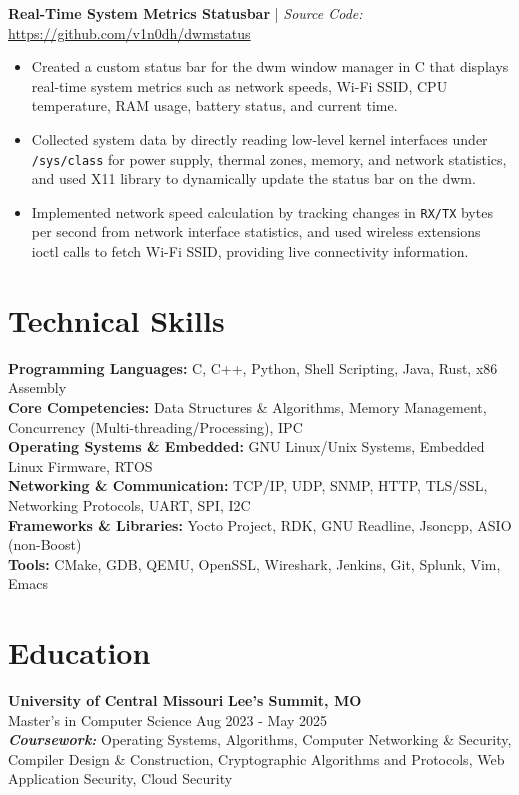 \documentclass[10pt, letterpad, sans]{extarticle}
\newcommand{\projsection}[2] {
	\raggedright{\normalsize\bfseries{#1}} | {\small \textit{Source Code:} \hspace{0.1em} \href{#2}{#2}}
}
\newcommand{\edusection}[5] {
	\raggedright\normalsize{\textbf{#1}
	\hfill {\small \textbf{#2}} } \\
	{#4}
	\hfill {\small {#3}} \\
	{\small #5} }
\begin{document}
\vspace*{0.5em}
\projsection
{Real-Time System Metrics Statusbar}
{https://github.com/v1n0dh/dwmstatus}
\begin{itemize}[leftmargin=6mm]
	\item{Created a custom status bar for the dwm window manager in C that displays real-time system metrics such as network speeds, Wi-Fi SSID, CPU temperature, RAM usage, battery status, and current time.}
	\item{Collected system data by directly reading low-level kernel interfaces under \texttt{/sys/class} for power supply, thermal zones, memory, and network statistics, and used X11 library to dynamically update the status bar on the dwm.}
	\item{Implemented network speed calculation by tracking changes in \texttt{RX/TX} bytes per second from network interface statistics, and used wireless extensions ioctl calls to fetch Wi-Fi SSID, providing live connectivity information.}
\end{itemize}

\section{Technical Skills}
\textbf{Programming Languages:} C, C++, Python, Shell Scripting, Java, Rust, x86 Assembly \\
\textbf{Core Competencies:} Data Structures \& Algorithms, Memory Management, Concurrency (Multi-threading/Processing), IPC \\
\textbf{Operating Systems \& Embedded:} GNU Linux/Unix Systems, Embedded Linux Firmware, RTOS \\
\textbf{Networking \& Communication:} TCP/IP, UDP, SNMP, HTTP, TLS/SSL, Networking Protocols, UART, SPI, I2C \\
\textbf{Frameworks \& Libraries:} Yocto Project, RDK, GNU Readline, Jsoncpp, ASIO (non-Boost) \\
\textbf{Tools:} CMake, GDB, QEMU, OpenSSL, Wireshark, Jenkins, Git, Splunk, Vim, Emacs

\noindent
\section{Education}
\edusection
{University of Central Missouri}
{Lee's Summit, MO}
{Aug 2023 {-} May 2025}
{Master's in Computer Science}
{{\bfseries \textit {Coursework:}} Operating Systems, Algorithms, Computer Networking \& Security, Compiler Design \& Construction, Cryptographic Algorithms and Protocols, Web Application Security, Cloud Security}
\end{document}
